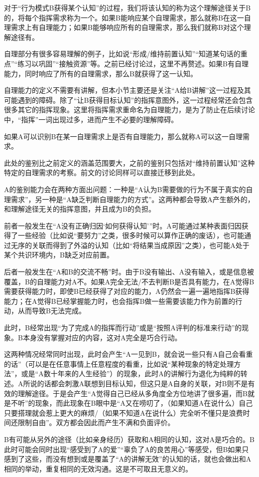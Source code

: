 对于“行为模式B获得某个认知”的过程，我们将该认知的称为这个理解途径关于B的，将每个指挥需求称为一个。如果B能响应某个自理需求，那么就称B在这一自理需求上有自理能力；如果B能够响应所有的自理需求，那么我们就称B对这个理解途径有。
\begin{explain}
自理部分有很多容易理解的例子，比如说“形成/维持前置认知”“知道某句话的重点”“练习以巩固”“接触资源”等。之前已经讨论过，这里不再赘述。如果B有自理能力，同时响应了所有的自理需求，那么B就获得了这一认知。

自理能力的定义不需要有讲解，但本小节主要还是关注“A给B讲解”这一过程及其可能遇到的障碍。除了“让B获得目标认知”的指挥意图外，这一过程经常还会包含很多其它的指挥现象。这里将指挥需求重命名为自理能力，是为了防止在后续讨论中，“指挥”一词出现过多，进而产生不必要的理解障碍。
\end{explain}
如果A可以识别B在某一自理需求上是否有自理能力，那么就称A可以这一自理需求。
\begin{explain}
此处的鉴别比之前定义的涵盖范围要大，之前的鉴别只包括对“维持前置认知”这种特定的自理需求的考察。前文的讨论同样可以直接迁移到此处。

A的鉴别能力会在两种方面出问题：一种是“A认为B需要做的行为不属于真实的自理需求”，另一种是“A缺乏判断自理能力的方式”。这两种都会导致A产生额外的，和理解途径无关的指挥意图，并且成为B的负担。

前者一般发生在“A没有正确归因‘如何获得认知’”时。A可能通过某种表面归因获得了一些经验（比如说“要努力”之类，很多时候可以算作正确的废话），也可能通过无序的关联而得到了外溢的认知（比如“将结果当成原因”之类），也可能A处于某个共识环境内，B缺乏对应前置。

后者一般发生在“A和B的交流不畅”时。由于B没有输出、A没有输入，或是信息被覆盖，B的自理能力对A不。如果A完全无法/不去判断B是否具有能力，在A觉得B需要获得能力时，即使B已经获得了对应的能力，A仍然会一遍一遍地指挥B获得能力；在A觉得B已经掌握能力时，也会指挥B做一些需要该能力作为前置的行动，从而导致B无法完成。

此时，B经常出现“为了完成A的指挥而行动”或是“按照A评判的标准来行动”的现象。B本身没有掌握对应的内容，这对A完全是巧合行动。

这两种情况经常同时出现，此时会产生“A一见到B，就会说一些只有A自己会看重的话”（可以是在任意事情上任意程度的看重，比如说“某种现象的特定处理方法”，或是“A数十年来的人生经验”）的现象，此时A的讲解行为退化为纯粹的转述。A所说的话都会刺激A联想到目标认知，但这只是A自身的关联，对B则不是有效的理解途径。于是会产生“A觉得自己已经从多角度全方位地讲了很多遍，而B就是不听”的现象，而此现象在B眼中是“A又在唠叨了，（如果知道A在说什么）自己只要搭理就会惹上更大的麻烦/（如果不知道A在说什么）完全听不懂只是浪费时间还限制自由”。双方都会因此而产生不满和负面评价。

B有可能从另外的途径（比如亲身经历）获取和A相同的认知，这对A是巧合的。B此时可能会同时出现“感受到了A的爱”“辜负了A的良苦用心”等感受，但B如果只感到了这些，而没有想到或是覆盖了“A的讲解无效”的认知的话，就也会做出和A相同的举动，重复相同的无效沟通。这是不可取且无意义的。
\end{explain}

